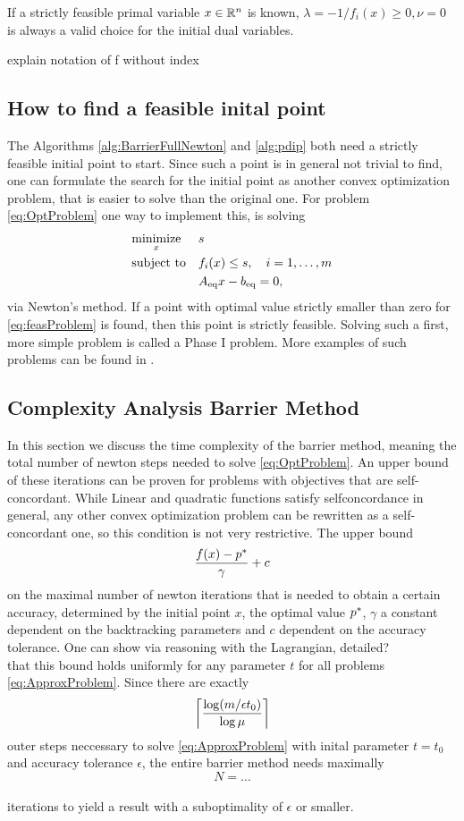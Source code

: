 \begin{remark}
	If a strictly feasible primal variable $ x \in \Rn $ is known, $ \lambda= -1/f_i(x) \geq 0, \nu=0 $ is always a valid choice for the initial dual variables.
\end{remark}

\todo explain notation of f without index
\subsection{How to find a feasible inital point}
The Algorithms \ref{alg:BarrierFullNewton} and \ref{alg:pdip} both need a strictly feasible initial point to start. Since such a point is in general not trivial to find, one can formulate the search for the initial point as another convex optimization problem, that is easier to solve than the original one.  
For problem \eqref{eq:OptProblem} one way to implement this, is solving
\begin{equation}
	\OptProblemfeas
	\label{eq:feasProblem}
\end{equation}
via Newton's method. If a point with optimal value strictly smaller than zero for \eqref{eq:feasProblem} is found, then this point is strictly feasible. Solving such a first, more simple problem is called a Phase I problem. More examples of such problems can be found in \cite{BV}.


\subsection{Complexity Analysis Barrier Method}
In this section we discuss the time complexity of the barrier method, meaning the total number of newton steps needed to solve \eqref{eq:OptProblem}. 
An upper bound of these iterations can be proven for problems with objectives that are self-concordant. While Linear and quadratic functions satisfy selfconcordance in general, any other convex optimization problem can be rewritten as a self-concordant one, so this condition is not very restrictive.
The upper bound
\begin{equation}
	\frac{\fx - \popt}{\gamma} + c
\end{equation}
on the maximal number of newton iterations that is needed to obtain a certain accuracy, determined by the initial point $ x $, the optimal value $ \popt $, $ \gamma $ a constant dependent on the backtracking parameters and $ c $ dependent on the accuracy tolerance. One can show via reasoning with the Lagrangian, \todo detailed?\\
that this bound holds uniformly for any parameter $ t $ for all problems \eqref{eq:ApproxProblem}.
 Since there are exactly \[ \ceil*{ \frac{\log(m/\epsilon t_0)}{\log \mu}} \] outer steps neccessary to solve  \eqref{eq:ApproxProblem} with inital parameter $ t=t_0  $ and accuracy tolerance $ \epsilon $, the entire barrier method needs maximally
 \[ N = \dots  \] \todo\\
 iterations to yield a result with a suboptimality of $ \epsilon $ or smaller.


